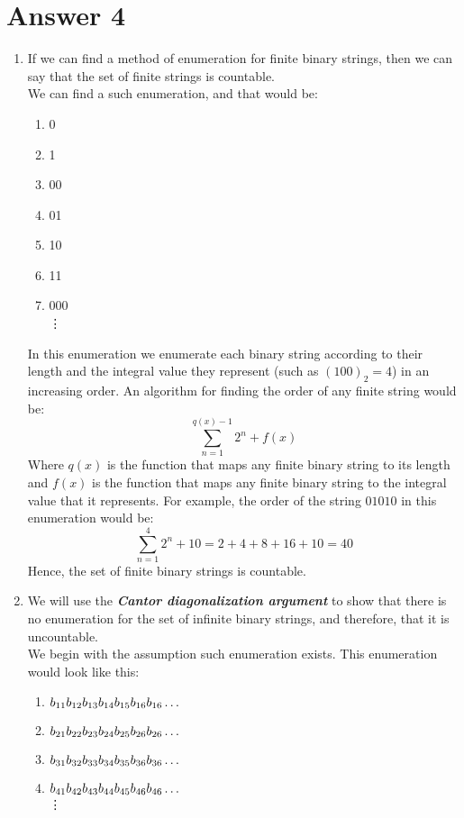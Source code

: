 \documentclass[11pt]{article}
\begin{document}
\section*{Answer 4}
\begin{enumerate}[label=\textbf{\alph*)}]
	\item If we can find a method of enumeration for finite binary strings, then we can say that the set of finite strings is countable.\\
	We can find a such enumeration, and that would be:\\
		\begin{enumerate}[label=\arabic*-]
		\item 0
		\item 1
		\item 00
		\item 01
		\item 10
		\item 11
		\item 000\\
		\vdots
	\end{enumerate}
		In this enumeration we enumerate each binary string according to their length and the integral value they represent (such as $(100)_2 = 4$) in an increasing order. An algorithm for finding the order of any finite string would be:
		\begin{equation*}
			\sum_{n=1}^{q(x)-1} 2^n + f(x)
		\end{equation*}
		Where $q(x)$ is the function that maps any finite binary string to its length and $f(x)$ is the function that maps any finite binary string to the integral value that it represents. For example, the order of the string $01010$ in this enumeration would be:\\
		\begin{equation*}
			\sum_{n=1}^{4} 2^n + 10 = 2 + 4 + 8 + 16 + 10 = 40
		\end{equation*}
		Hence, the set of finite binary strings is countable.
	\item We will use the \textbf{\textit{Cantor diagonalization argument}} to show that there is no enumeration for the set of infinite binary strings, and therefore, that it is uncountable.\\

	We begin with the assumption such enumeration exists. This enumeration would look like this:\\
	\begin{enumerate}[label=\arabic*-]
		\item $b_{11}b_{12}b_{13}b_{14}b_{15}b_{16}b_{16}\mathellipsis$
		\item $b_{21}b_{22}b_{23}b_{24}b_{25}b_{26}b_{26}\mathellipsis$
		\item $b_{31}b_{32}b_{33}b_{34}b_{35}b_{36}b_{36}\mathellipsis$
		\item $b_{41}b_{42}b_{43}b_{44}b_{45}b_{46}b_{46}\mathellipsis$\\
			\vdots


\end{enumerate}
\end{enumerate}
\end{document}

